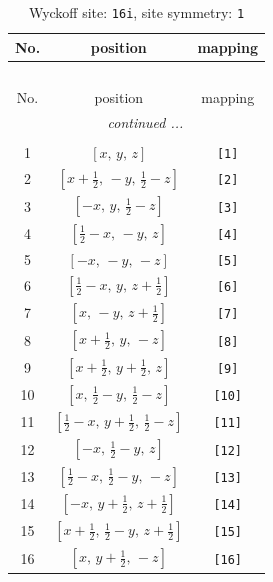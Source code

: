 \documentclass[fleqn,8pt]{jsarticle}
\begin{document}
\begin{longtable}{ccc}
\caption{Wyckoff site: {\tt 16i}, site symmetry: {\tt 1}}
 \\
 \hline \hline
No. & position & mapping \\ \hline \endfirsthead

\multicolumn{2}{l}{\tablename\ \thetable{}} \\
 \hline \hline
No. & position & mapping \\ \hline \endhead

 \hline \hline
\multicolumn{2}{r}{\footnotesize\it continued ...} \\ \endfoot

 \hline \hline
\multicolumn{2}{r}{} \\ \endlastfoot

1 & $\left[ x,\, y,\, z \right]$ & {\tt [1]} \\ \hline
2 & $\left[ x + \frac{1}{2},\, - y,\, \frac{1}{2} - z \right]$ & {\tt [2]} \\ \hline
3 & $\left[ - x,\, y,\, \frac{1}{2} - z \right]$ & {\tt [3]} \\ \hline
4 & $\left[ \frac{1}{2} - x,\, - y,\, z \right]$ & {\tt [4]} \\ \hline
5 & $\left[ - x,\, - y,\, - z \right]$ & {\tt [5]} \\ \hline
6 & $\left[ \frac{1}{2} - x,\, y,\, z + \frac{1}{2} \right]$ & {\tt [6]} \\ \hline
7 & $\left[ x,\, - y,\, z + \frac{1}{2} \right]$ & {\tt [7]} \\ \hline
8 & $\left[ x + \frac{1}{2},\, y,\, - z \right]$ & {\tt [8]} \\ \hline
9 & $\left[ x + \frac{1}{2},\, y + \frac{1}{2},\, z \right]$ & {\tt [9]} \\ \hline
10 & $\left[ x,\, \frac{1}{2} - y,\, \frac{1}{2} - z \right]$ & {\tt [10]} \\ \hline
11 & $\left[ \frac{1}{2} - x,\, y + \frac{1}{2},\, \frac{1}{2} - z \right]$ & {\tt [11]} \\ \hline
12 & $\left[ - x,\, \frac{1}{2} - y,\, z \right]$ & {\tt [12]} \\ \hline
13 & $\left[ \frac{1}{2} - x,\, \frac{1}{2} - y,\, - z \right]$ & {\tt [13]} \\ \hline
14 & $\left[ - x,\, y + \frac{1}{2},\, z + \frac{1}{2} \right]$ & {\tt [14]} \\ \hline
15 & $\left[ x + \frac{1}{2},\, \frac{1}{2} - y,\, z + \frac{1}{2} \right]$ & {\tt [15]} \\ \hline
16 & $\left[ x,\, y + \frac{1}{2},\, - z \right]$ & {\tt [16]} \\
\end{longtable}
\end{document}
